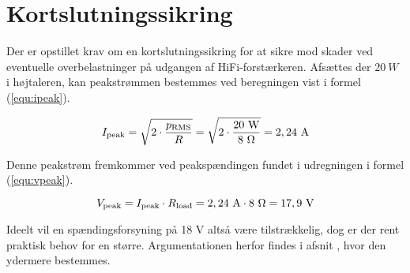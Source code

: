 \section{Kortslutningssikring}
\label{valg_kortslutningssikring}
Der er opstillet krav om en kortslutningssikring for at sikre mod skader ved eventuelle overbelastninger på udgangen af HiFi-forstærkeren. Afsættes der $20~W$ i højtaleren, kan peakstrømmen bestemmes ved beregningen vist i formel (\ref{equ:ipeak}).

\begin{equation}
\label{equ:ipeak}
I_{\mathrm{peak}} = \sqrt{2 \cdot \frac{p_{\mathrm{RMS}}}{R}} = \sqrt{2 \cdot \frac{\mathrm{20~W}}{8~\ohm}}  = \mathrm{2,24~A}
\end{equation}

Denne peakstrøm fremkommer ved peakspændingen fundet i udregningen i formel (\ref{equ:vpeak}).

\begin{equation}
\label{equ:vpeak}
V_{\mathrm{peak}} = I_{\mathrm{peak}} \cdot R_{\mathrm{load}} = \mathrm{2,24~A \cdot 8~\ohm = 17,9~V}
\end{equation}

Ideelt vil en spændingsforsyning på 18 V altså være tilstrækkelig, dog er der rent praktisk behov for en større. Argumentationen herfor findes i afsnit , hvor den ydermere bestemmes.